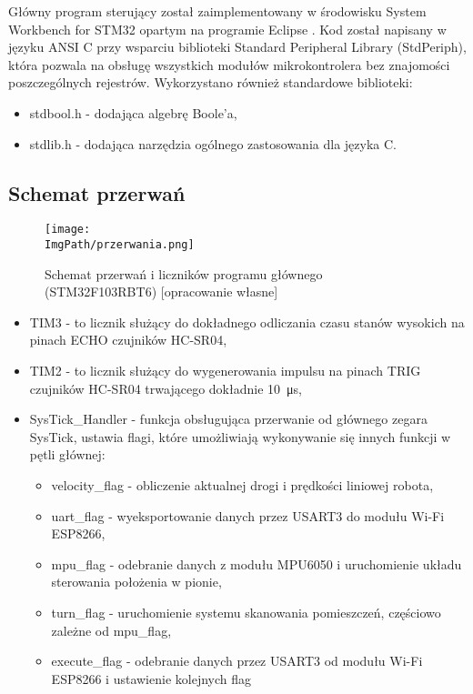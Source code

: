 \documentclass[a4paper,12pt,twoside,openany]{report}
\newcommand{\ImgPath}{.}
\begin{document}
Główny program sterujący został zaimplementowany w środowisku System Workbench for STM32 opartym na programie Eclipse \cite{openstm32}. Kod został napisany w języku ANSI C przy wsparciu biblioteki Standard Peripheral Library (StdPeriph), która pozwala na obsługę wszystkich modułów mikrokontrolera bez znajomości poszczególnych rejestrów. Wykorzystano również standardowe biblioteki:
\begin{itemize}
\item stdbool.h - dodająca algebrę Boole'a,
\item stdlib.h - dodająca narzędzia ogólnego zastosowania dla języka C.
\end{itemize}

\subsection{Schemat przerwań}

\begin{figure}[!htbp]
	\begin{center}
\centering
\texttt{[image: \\ImgPath/przerwania.png]}
\end{center}
	\caption{Schemat przerwań i liczników programu głównego (STM32F103RBT6) [opracowanie własne]}
	\label{schematKomunikacji}
\end{figure}

\begin{itemize}
\item TIM3 - to licznik służący do dokładnego odliczania czasu stanów wysokich na pinach ECHO czujników HC-SR04,
\item TIM2 - to licznik służący do wygenerowania impulsu na pinach TRIG czujników HC-SR04 trwającego dokładnie \SI{10}{\micro s},
\item SysTick\_Handler - funkcja obsługująca przerwanie od głównego zegara SysTick, ustawia flagi, które umożliwiają wykonywanie się innych funkcji w pętli głównej:

\begin{itemize}
\item velocity\_flag - obliczenie aktualnej drogi i prędkości liniowej robota, 
\item uart\_flag - wyeksportowanie danych przez USART3 do modułu Wi-Fi ESP8266,
\item mpu\_flag - odebranie danych z modułu MPU6050 i uruchomienie układu sterowania położenia w pionie,
\item turn\_flag - uruchomienie systemu skanowania pomieszczeń, częściowo zależne od mpu\_flag,
\item execute\_flag - odebranie danych przez USART3 od modułu Wi-Fi ESP8266 i ustawienie kolejnych flag
\end{itemize}

\end{itemize}
\end{document}
